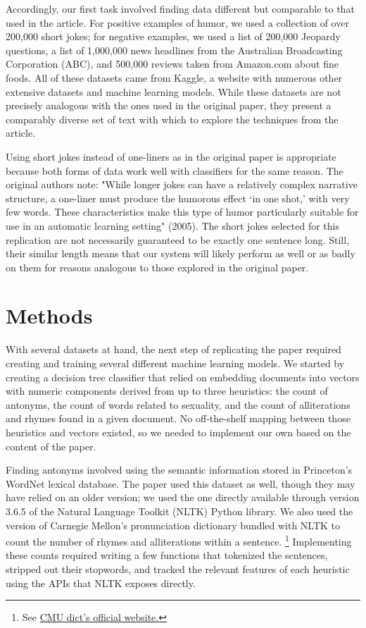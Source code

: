 \documentclass[11pt,a4paper]{article}
\begin{document}
Accordingly, our first task involved finding data different but comparable to that used in the article. For positive examples of humor, we used a collection of over 200,000 short jokes; for negative examples, we used a list of 200,000 Jeopardy questions, a list of 1,000,000 news headlines from the Australian Broadcasting Corporation (ABC), and 500,000 reviews taken from Amazon.com about fine foods. \cite{short-jokes} \cite{news-headlines} \cite{jeopardy-questions} \cite{amazon-reviews} All of these datasets came from Kaggle, a website with numerous other extensive datasets and machine learning models. While these datasets are not precisely analogous with the ones used in the original paper, they present a comparably diverse set of text with which to explore the techniques from the article.

Using short jokes instead of one-liners as in the original paper is appropriate because both forms of data work well with classifiers for the same reason. The original authors note: "While longer jokes can have a relatively complex narrative structure, a one-liner must produce the humorous effect `in one shot,' with very few words. These characteristics make this type of humor particularly suitable for use in an automatic learning setting" (2005). The short jokes selected for this replication are not necessarily guaranteed to be exactly one sentence long. Still, their similar length means that our system will likely perform as well or as badly on them for reasons analogous to those explored in the original paper.

\section{Methods}
With several datasets at hand, the next step of replicating the paper required creating and training several different machine learning models. We started by creating a decision tree classifier that relied on embedding documents into vectors with numeric components derived from up to three heuristics: the count of antonyms, the count of words related to sexuality, and the count of alliterations and rhymes found in a given document. No off-the-shelf mapping between those heuristics and vectors existed, so we needed to implement our own based on the content of the paper.

Finding antonyms involved using the semantic information stored in Princeton's WordNet lexical database. \cite{10.1145/219717.219748} The paper used this dataset as well, though they may have relied on an older version; we used the one directly available through version 3.6.5 of the Natural Language Toolkit (NLTK) Python library. \cite{10.5555/1717171} We also used the version of Carnegie Mellon's pronunciation dictionary bundled with NLTK to count the number of rhymes and alliterations within a sentence. \footnote{See \href{http://www.speech.cs.cmu.edu/cgi-bin/cmudict}{CMU dict's official website.}} Implementing these counts required writing a few functions that tokenized the sentences, stripped out their stopwords, and tracked the relevant features of each heuristic using the APIs that NLTK exposes directly.
\end{document}

